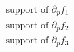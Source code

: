 \documentclass{amsart}
\begin{document}
\thispagestyle{empty}

\begin{align*}
\text{support of $\partial_p f_1$} \\
\text{support of $\partial_p f_2$} \\
\text{support of $\partial_p f_3$}
\end{align*}
\end{document}
